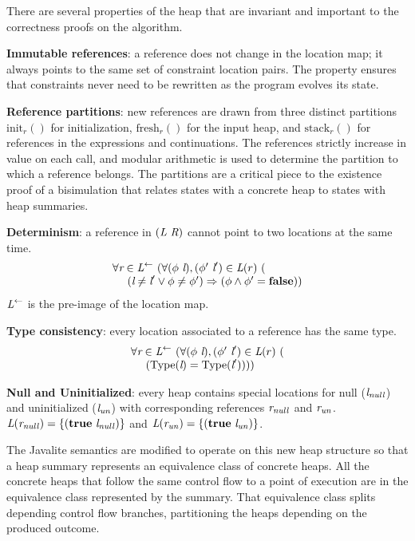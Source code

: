 There are several properties of the heap that are invariant and
important to the correctness proofs on the algorithm.
\begin{compactitem}
\item \textbf{Immutable references}: a reference does not change in
  the location map; it always points to the same set of constraint
  location pairs. The property ensures that constraints never need to
  be rewritten as the program evolves its state.
\item \textbf{Reference partitions}: new references are drawn from
  three distinct partitions $\mathrm{init}_r()$ for initialization,
  $\mathrm{fresh}_r()$ for the input heap, and $\mathrm{stack}_r()$
  for references in the expressions and continuations. The references
  strictly increase in value on each call, and modular arithmetic is
  used to determine the partition to which a reference belongs. The
  partitions are a critical piece to the existence proof of a
  bisimulation that relates states with a concrete heap to states with
  heap summaries.
\item \textbf{Determinism}: a reference in  $(\emph{L}\ \emph{R})$ cannot point to two locations at the same time.
\[
\begin{array}{l}
\forall \cfgnt{r} \in \cfgnt{L}^\leftarrow\ (\forall (\phi\ \cfgnt{l}),(\phi^\prime\ \cfgnt{l}^\prime) \in \cfgnt{L}(r)\ (\\
\ \ \ \ (\cfgnt{l} \neq \cfgnt{l}^\prime \vee \phi \neq \phi^\prime) \Rightarrow (\phi \wedge \phi^\prime = \cfgt{false}))
\end{array}
\]
$\emph{L}^\leftarrow$ is the pre-image of the location map.
\item \textbf{Type consistency}: every location associated to a reference has the same type.
\[
\begin{array}{l}
\forall \cfgnt{r} \in \cfgnt{L}^\leftarrow\ (\forall (\phi\ \cfgnt{l}),(\phi^\prime\ \cfgnt{l}^\prime) \in \cfgnt{L}(r)\ (\\
\ \ \ \ (\mathrm{Type}\lp\cfgnt{l}\rp = \mathrm{Type}\lp\cfgnt{l}^\prime\rp)))
\end{array}
\]
\item \textbf{Null and Uninitialized}: every heap contains special
  locations for null ($\emph{l}_\mathit{null}$) and uninitialized
  ($\emph{l}_\mathit{un}$) with corresponding references
  $\emph{r}_\mathit{null}$ and
  $\emph{r}_\mathit{un}$. $\emph{L}(\emph{r}_\mathit{null}) =
  \{(\textbf{true}\ \emph{l}_\mathit{null})\}$ and
  $\emph{L}(\emph{r}_\mathit{un}) =
  \{(\textbf{true}\ \emph{l}_\mathit{un})\}$.
\end{compactitem}
The Javalite semantics are modified to operate on this new heap
structure so that a heap summary represents an equivalence class of
concrete heaps. All the concrete heaps that follow the same control
flow to a point of execution are in the equivalence class represented
by the summary. That equivalence class splits depending control flow
branches, partitioning the heaps depending on the produced outcome.

